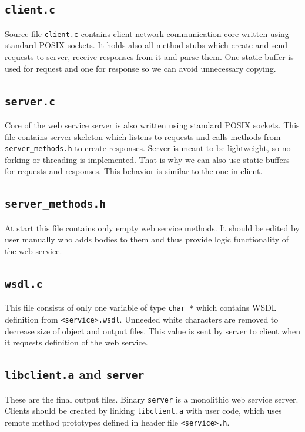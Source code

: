 \documentclass[12pt,notitlepage]{report}
\begin{document}
\subsection{\texttt{client.c}}
Source file \texttt{client.c} contains client network communication core written using standard POSIX sockets. It holds also all method stubs which create and send requests to server, receive responses from it and parse them. One static buffer is used for request and one for response so we can avoid unnecessary copying.

\subsection{\texttt{server.c}}
Core of the web service server is also written using standard POSIX sockets. This file contains server skeleton which listens to requests and calls methods from \texttt{server\_methods.h} to create responses. Server is meant to be lightweight, so no forking or threading is implemented. That is why we can also use static buffers for requests and responses. This behavior is similar to the one in client.

\subsection{\texttt{server\_methods.h}}
At start this file contains only empty web service methods. It should be edited by user manually who adds bodies to them and thus provide logic functionality of the web service.

\subsection{\texttt{wsdl.c}}
This file consists of only one variable of type \texttt{char *} which contains WSDL definition from \texttt{<service>.wsdl}. Unneeded white characters are removed to decrease size of object and output files. This value is sent by server to client when it requests definition of the web service.

\subsection{\texttt{libclient.a} and \texttt{server}}
These are the final output files. Binary \texttt{server} is a monolithic web service server. Clients should be created by linking \texttt{libclient.a} with user code, which uses remote method prototypes defined in header file \texttt{<service>.h}.
\end{document}
